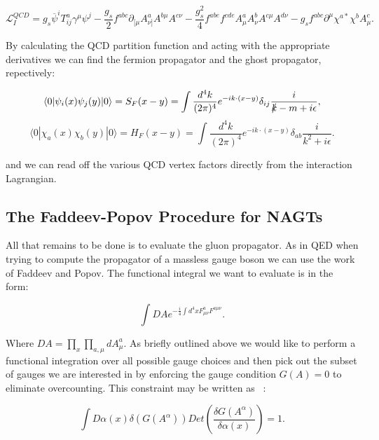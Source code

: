 	\begin{equation}
	\mathcal{L}_{I}^{QCD} = g_s\overline{\psi}^i T^a_{ij}\gamma^\mu\psi^j-\frac{g_s}{2}f^{abc}\partial_{[\mu}A^a_{\nu]}A^{b\mu}A^{c\nu}-\frac{g_s^2}{4}f^{abe}f^{cde}A^a_\mu A^b_\nu A^{c\mu}A^{d\nu}-g_sf^{abc}\partial^\mu\chi^{a*}\chi^bA^c_\mu.
	\end{equation}

	By calculating the QCD partition function and acting with the appropriate derivatives we can find the fermion propagator and the ghost propagator, repectively:

	\begin{equation}
	\langle0|\psi_i(x)\psi_j(y)|0\rangle = S_F(x-y) = \int \frac{d^4k}{(2\pi)^4}e^{-ik\cdot(x-y)}\delta_{ij}\frac{i}{\slashed k - m +i\epsilon},
	\end{equation}
	\begin{equation}
	\langle0|\chi_a(x)\chi_b(y)|0\rangle = H_F(x-y) = \int \frac{d^4k}{(2\pi)^4}e^{-ik\cdot(x-y)}\delta_{ab}\frac{i}{k^2+i\epsilon}.
	\end{equation}

	and we can read off the various QCD vertex factors directly from the interaction Lagrangian.

	\subsection{The Faddeev-Popov Procedure for NAGTs}

	All that remains to be done is to evaluate the gluon propagator.  As in QED when trying to compute the propagator of a massless gauge boson we can use the work of Faddeev and Popov.  The functional integral we want to evaluate is in the form:

	\begin{equation}
	\int DAe^{-\frac{i}{4}\int d^4xF^a_{\mu\nu}F^{a\mu\nu}}.
	\end{equation}

	Where $DA=\prod_x\prod_{a, \mu}dA^a_\mu$.  As briefly outlined above we would like to perform a functional integration over all possible gauge choices and then pick out the subset of gauges we are interested in by enforcing the gauge condition $G(A)=0$ to eliminate overcounting.  This constraint may be written as ~\cite{p&s}:

	\begin{equation}
	\int D\alpha(x)\delta(G(A^\alpha))Det\left(\frac{\delta G(A^\alpha)}{\delta\alpha(x)}\right) = 1.
	\end{equation}

